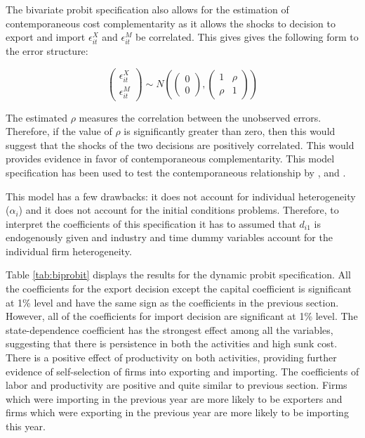 \documentclass[12pt]{article}
\begin{document}
The bivariate probit specification also allows for the estimation of 
contemporaneous cost complementarity as it allows the shocks to
decision to export and import 
$\epsilon_{it}^{X}$ and $\epsilon_{it}^{M}$  be
correlated. This gives gives the following form to the error
structure: 


\[\begin{pmatrix}
\epsilon_{it}^{X} \\
\epsilon_{it}^{M}
\end{pmatrix}\sim N\left(\begin{pmatrix}
0 \\
0
\end{pmatrix},\begin{pmatrix}
1 & \rho \\
\rho & 1
\end{pmatrix}\right)
\]


The estimated $\rho$ measures the correlation between the unobserved
errors. Therefore, if the value of $\rho$ is significantly greater than
zero,  then this would suggest that the shocks of the two decisions
are positively correlated. This would provides evidence in favor 
of contemporaneous complementarity.  
This model specification has been used to test the contemporaneous relationship
by \textcite{aristei2013firms}, \textcite{aw2007export} and \textcite{manez2015dynamic}. 

This model has a few drawbacks: it does not account for individual
heterogeneity ($\alpha_{i}$) and it does not account for the  initial
conditions problems. Therefore, to interpret the coefficients of this
specification it has to assumed that $d_{i1}$ is 
endogenously given and  industry and time dummy variables account
for the individual firm heterogeneity.

Table \ref{tab:biprobit} displays the results for the dynamic probit specification. All
  the coefficients for the export decision except the capital coefficient is significant at
  1\% level and have the same sign 
  as the coefficients in the previous section. However,  all of the coefficients
  for import decision are significant at 1\% level. The
  state-dependence coefficient has the strongest effect among all
  the variables, suggesting that there is persistence in both the
  activities and high sunk cost. There is a positive effect of 
  productivity on both activities, providing further evidence of
  self-selection of firms into exporting and importing. The
  coefficients of labor and productivity are positive and
  quite similar to previous section. Firms which were importing in the previous year are more
  likely to be exporters and firms which were exporting in the
  previous year are more likely to be importing this year.
\end{document}
